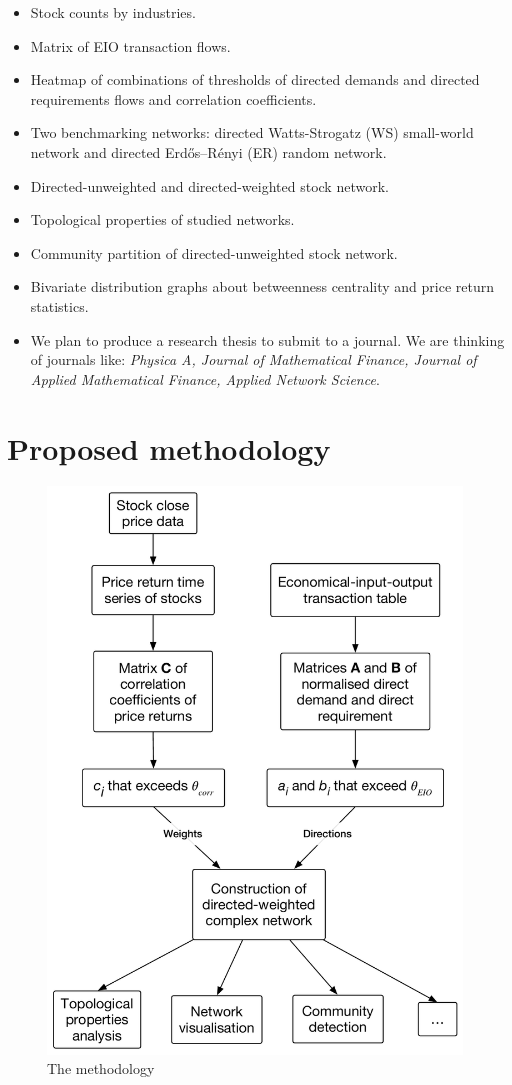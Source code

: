\begin{itemize}
	\item Stock counts by industries.
	\item Matrix of EIO transaction flows.
	\item Heatmap of combinations of thresholds of directed demands and directed requirements flows and correlation coefficients.
	\item Two benchmarking networks: directed Watts-Strogatz (WS) small-world network and directed Erdős–Rényi (ER) random network.
	\item Directed-unweighted and directed-weighted stock network.
	\item Topological properties of studied networks.
	\item Community partition of directed-unweighted stock network.
	\item Bivariate distribution graphs about betweenness centrality and price return statistics.
	\item We plan to produce a research thesis to submit to a journal. We are thinking of journals like:  \textit{Physica A, Journal of Mathematical Finance, Journal of Applied Mathematical Finance, Applied Network Science}.
\end{itemize}

\section{Proposed methodology}
\begin{figure}
	\begin{center}
		\includegraphics[width=11cm]{methodology_diagram}
	\end{center}
	\caption{The methodology}
	\label{fig:methodology_diagram}
\end{figure}

